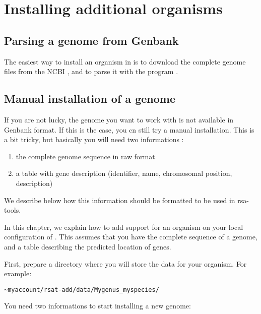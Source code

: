 
\section{Installing additional organisms}

\subsection{Parsing a genome from Genbank}

The easiest way to install an organism in \RSAT is to download the
complete genome files from the NCBI
, and to parse it with the
program .




\subsection{Manual installation of a genome}

If you are not lucky, the genome you want to work with is not
available in Genbank format. If this is the case, you cn still try a
manual installation. This is a bit tricky, but basically you will need
two informations :

\begin{enumerate}
\item the complete genome sequence in raw format
\item a table with gene description (identifier, name, chromosomal
  position, description)
\end{enumerate}

We describe below how this information should be formatted to be used
in rsa-tools.

In this chapter, we explain how to add support for an organism on your
local configuration of \RSAT. This assumes that you have the complete
sequence of a genome, and a table describing the predicted location of
genes.

First, prepare a directory where you will store the data for your
organism. For example:

\begin{verbatim}
~myaccount/rsat-add/data/Mygenus_myspecies/
\end{verbatim}

You need two informations to start installing a new genome:


